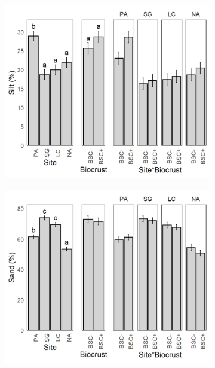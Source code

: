 \begin{figure}[htbp]
    \begin{subfigure}[b]{0.32\textwidth} %
        \centering
        \includegraphics[width=\linewidth]{img/M1-Figure_2-10.png}
    \end{subfigure}
    \begin{subfigure}[b]{0.32\textwidth}
        \centering
        \includegraphics[width=\linewidth]{img/M1-Figure_2-11.png}
    \end{subfigure}


\end{figure}
